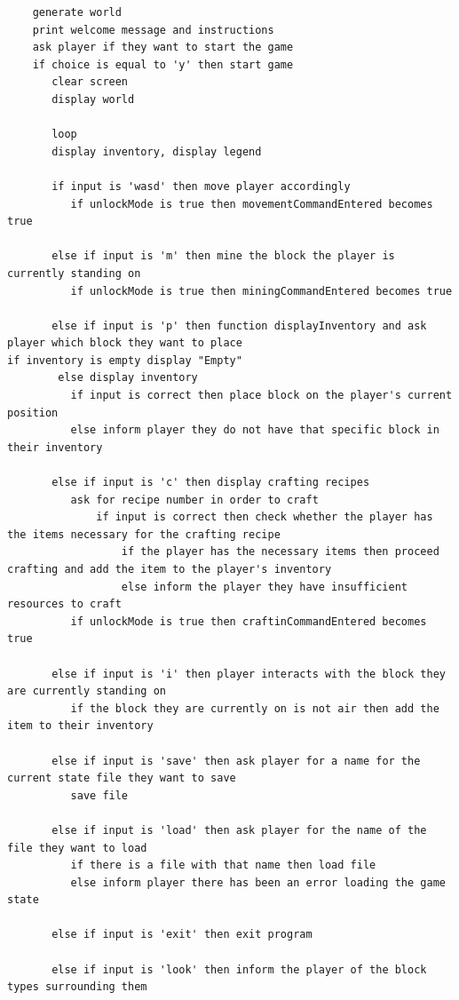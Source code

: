 \begin{lstlisting}
    generate world
    print welcome message and instructions
    ask player if they want to start the game
    if choice is equal to 'y' then start game 
       clear screen
       display world
    
       loop
       display inventory, display legend
    
       if input is 'wasd' then move player accordingly 
          if unlockMode is true then movementCommandEntered becomes true
    
       else if input is 'm' then mine the block the player is currently standing on
          if unlockMode is true then miningCommandEntered becomes true
    
       else if input is 'p' then function displayInventory and ask player which block they want to place                                               	if inventory is empty display "Empty"
        else display inventory
          if input is correct then place block on the player's current position
          else inform player they do not have that specific block in their inventory
    
       else if input is 'c' then display crafting recipes 
          ask for recipe number in order to craft 
              if input is correct then check whether the player has the items necessary for the crafting recipe
                  if the player has the necessary items then proceed crafting and add the item to the player's inventory
                  else inform the player they have insufficient resources to craft
          if unlockMode is true then craftinCommandEntered becomes true
       
       else if input is 'i' then player interacts with the block they are currently standing on
          if the block they are currently on is not air then add the item to their inventory
    
       else if input is 'save' then ask player for a name for the current state file they want to save
          save file
    
       else if input is 'load' then ask player for the name of the file they want to load
          if there is a file with that name then load file
          else inform player there has been an error loading the game state
    
       else if input is 'exit' then exit program
    
       else if input is 'look' then inform the player of the block types surrounding them
    

\end{lstlisting}
